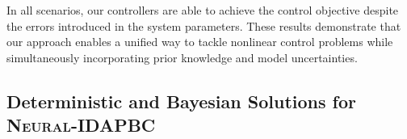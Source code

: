 \begin{enumerate}
    In all scenarios, our controllers are able to achieve the control objective
    despite the errors introduced in the system parameters.
    These results demonstrate that our approach enables a unified way to tackle
    nonlinear control problems while simultaneously incorporating prior knowledge
    and model uncertainties.
    
\end{enumerate} 
%
\subsection{Deterministic and Bayesian Solutions for \textsc{Neural-IDAPBC}}

